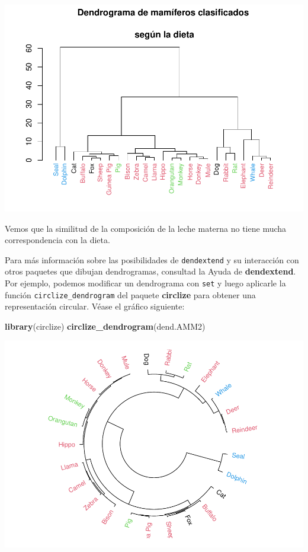 \documentclass[
]{book}
\newenvironment{Shaded}{\begin{snugshade}}{\end{snugshade}}
\newcommand{\KeywordTok}[1]{\textcolor[rgb]{0.13,0.29,0.53}{\textbf{#1}}}
\newcommand{\NormalTok}[1]{#1}
\theoremstyle{definition}
\theoremstyle{definition}
\theoremstyle{definition}
\theoremstyle{remark}
\begin{document}
\begin{center}\includegraphics[width=0.9\linewidth]{14cap13_EDextra_files/figure-latex/unnamed-chunk-29-1} \end{center}

Vemos que la similitud de la composición de la leche materna no tiene mucha correspondencia con la dieta.

Para más información sobre las posibilidades de \texttt{dendextend} y su interacción con otros paquetes que dibujan dendrogramas, consultad la Ayuda de \textbf{dendextend}. Por ejemplo,
podemos modificar un dendrograma con \texttt{set} y luego
aplicarle la función \texttt{circlize\_dendrogram} del paquete \textbf{circlize} para obtener una representación circular. Véase el gráfico siguiente:

\begin{Shaded}
\begin{Highlighting}[]
\KeywordTok{library}\NormalTok{(circlize)}
\KeywordTok{circlize\_dendrogram}\NormalTok{(dend.AMM2)}
\end{Highlighting}
\end{Shaded}

\begin{center}\includegraphics[width=0.9\linewidth]{14cap13_EDextra_files/figure-latex/unnamed-chunk-30-1} \end{center}
\end{document}
